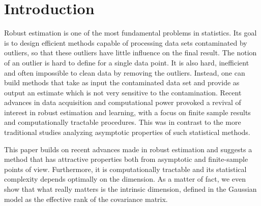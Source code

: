 \documentclass[aos,preprint,reqno]{imsart}
\theoremstyle{plain}
\theoremstyle{remark}
\begin{document}
	\maketitle

	\itemsep=0pt
	\setcounter{tocdepth}{1}
	\tableofcontents


	\section{Introduction}\label{sec:intro}

    Robust estimation is one of the most fundamental 
    problems in statistics. Its goal is to design efficient 
    methods capable of processing data sets contaminated 
    by outliers, so that these outliers have little influence 
    on the final result. The notion of an outlier is hard to 
    define for a single data point. It is also hard, inefficient 
    and often impossible to clean data by removing the outliers. 
    Instead, one can build methods that take as input the 
    contaminated data set and provide as output an estimate 
    which is not very sensitive to the contamination. Recent 
    advances in data acquisition and computational power 
    provoked a revival of interest in robust estimation and 
    learning, with a focus on finite sample results and 
    computationally tractable procedures. This was in contrast 
    to the more traditional studies analyzing asymptotic 
    properties of such statistical methods. 
    
    This paper builds on recent advances made in robust 
    estimation and suggests a method that has attractive 
    properties both from asymptotic and finite-sample points 
    of view. Furthermore, it is computationally tractable 
    and its statistical complexity depends optimally on 
    the dimension. As a matter of fact, we even show that 
    what really matters is the intrinsic dimension, defined 
    in the Gaussian model as the effective rank of the 
    covariance matrix. 
    
\end{document}
